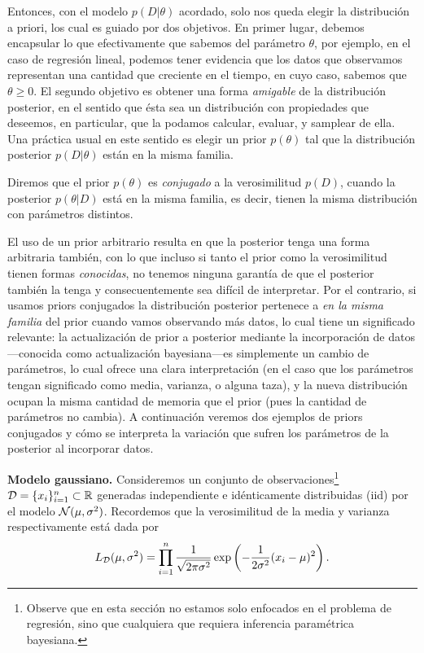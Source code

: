 Entonces, con el modelo $p(D|\theta)$ acordado, solo nos queda elegir la distribución a priori, los cual es guiado por dos objetivos. En primer lugar, debemos encapsular lo que efectivamente que sabemos del parámetro $\theta$, por ejemplo, en el caso de regresión lineal, podemos tener evidencia que los datos que observamos representan una cantidad que creciente en el tiempo, en cuyo caso, sabemos que $\theta\geq 0$. El segundo objetivo es obtener una forma \emph{amigable} de la distribución posterior, en el sentido que ésta sea un distribución con propiedades que deseemos, en particular, que la podamos calcular, evaluar, y samplear de ella. Una práctica usual en este sentido es elegir un prior $p(\theta)$ tal que la distribución posterior $p(D|\theta)$ están en la misma familia. 
\begin{definition}
	Diremos que el prior $p(\theta)$ es \emph{conjugado} a la verosimilitud $p(D)$, cuando la posterior $p(\theta|D)$ está en la misma familia, es decir, tienen la misma distribución con parámetros distintos.   
\end{definition}
El uso de un prior arbitrario resulta en que la posterior tenga una forma arbitraria también, con lo que incluso si tanto el prior como la verosimilitud tienen formas \emph{conocidas}, no tenemos ninguna garantía de que el posterior también la tenga y consecuentemente sea difícil de interpretar. Por el contrario, si usamos priors conjugados la distribución posterior pertenece a \emph{en la misma familia} del prior cuando vamos observando más datos, lo cual tiene un significado relevante: la actualización de prior a posterior mediante la incorporación de datos---conocida como actualización bayesiana---es simplemente un cambio de parámetros, lo cual ofrece una clara interpretación (en el caso que los parámetros tengan significado como media, varianza, o alguna taza), y la nueva distribución ocupan la misma cantidad de memoria que el prior (pues la cantidad de parámetros no cambia). A continuación veremos dos ejemplos de priors conjugados y cómo se interpreta la variación que sufren los parámetros de la posterior al incorporar datos.

\textbf{Modelo gaussiano.} Consideremos un conjunto de observaciones\footnote{Observe que en esta sección no estamos solo enfocados en el problema de regresión, sino que cualquiera que requiera inferencia paramétrica bayesiana.} ${\mathcal D}=\{x_i\}_{i=1}^n\subset{\mathbb R}$ generadas independiente e idénticamente distribuidas (iid) por el modelo ${\mathcal N}(\mu,\sigma^2)$. Recordemos que la verosimilitud de la media y varianza respectivamente está dada por 
\begin{equation}
	L_{\mathcal D}(\mu, \sigma^2) = \prod_{i=1}^n \frac{1}{\sqrt{2\pi\sigma^2}}\exp\left(-\frac{1}{2\sigma^2}(x_i-\mu)^2\right).
 \end{equation}

